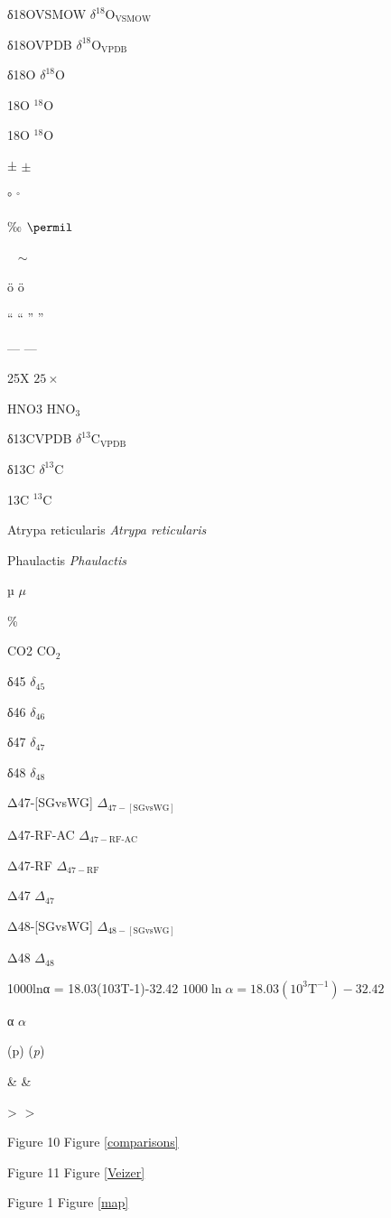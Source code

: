 δ18OVSMOW
$\delta^{18}$O$_{\text{VSMOW}}$

δ18OVPDB
$\delta^{18}$O$_{\text{VPDB}}$

δ18O
$\delta^{18}$O

18O
$^{18}$O

18O
$^{18}$O

±
$\pm$

°
$^{\circ}$

‰
$\permil$

~
$\sim$

ö
\"{o}

 “
 ``
” 
''

—
---

25X
$25\times$

HNO3
HNO$_3$

δ13CVPDB
$\delta^{13}$C$_{\text{VPDB}}$

δ13C
$\delta^{13}$C

13C
$^{13}$C

Atrypa reticularis
\textit{Atrypa reticularis}

Phaulactis
\textit{Phaulactis}

µ
$\mu$

%
\%

CO2
CO$_2$

δ45
$\delta_{45}$

δ46
$\delta_{46}$

δ47 %
$\delta_{47}$

δ48 %
$\delta_{48}$

Δ47-[SGvsWG]
$\Delta_{47-[\text{SGvsWG}]}$

Δ47-RF-AC
$\Delta_{47-\text{RF-AC}}$

Δ47-RF
$\Delta_{47-\text{RF}}$

Δ47 %
$\Delta_{47}$

Δ48-[SGvsWG]
$\Delta_{48-[\text{SGvsWG}]}$

Δ48 %
$\Delta_{48}$

1000lnα = 18.03(103T-1)-32.42 
$1000\ln\alpha=18.03(10^3\text{T}^{-1})-32.42$

α
$\alpha$

(p)
(\textit{p})

&
\&

>
$>$

Figure 10
Figure \ref{comparisons}

Figure 11
Figure \ref{Veizer}

Figure 1
Figure \ref{map}

